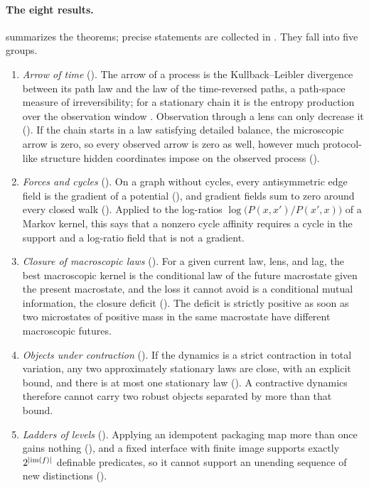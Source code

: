 \paragraph{The eight results.}
 summarizes the theorems; precise statements are collected in .
They fall into five groups.
\begin{enumerate}
  \item \emph{Arrow of time} ().
  The arrow of a process is the Kullback--Leibler divergence between its path law and the law of the time-reversed paths, a path-space measure of irreversibility; for a stationary chain it is the entropy production over the observation window \citep{MaesNetocny2003,Seifert2012}.
  Observation through a lens can only decrease it (\thmNGArrowDPI).
  If the chain starts in a law satisfying detailed balance, the microscopic arrow is zero, so every observed arrow is zero as well, however much protocol-like structure hidden coordinates impose on the observed process (\thmNGProtocolTrap).
  \item \emph{Forces and cycles} ().
  On a graph without cycles, every antisymmetric edge field is the gradient of a potential (\thmNGForceForest), and gradient fields sum to zero around every closed walk (\thmNGForceNull).
  Applied to the log-ratios $\log\bigl(P(x,x')/P(x',x)\bigr)$ of a Markov kernel, this says that a nonzero cycle affinity \citep{Schnakenberg1976} requires a cycle in the support and a log-ratio field that is not a gradient.
  \item \emph{Closure of macroscopic laws} ().
  For a given current law, lens, and lag, the best macroscopic kernel is the conditional law of the future macrostate given the present macrostate, and the loss it cannot avoid is a conditional mutual information, the closure deficit (\thmNGMacroClosureDeficit).
  The deficit is strictly positive as soon as two microstates of positive mass in the same macrostate have different macroscopic futures.
  \item \emph{Objects under contraction} ().
  If the dynamics is a strict contraction in total variation, any two approximately stationary laws are close, with an explicit bound, and there is at most one stationary law (\thmNGObjectContractive).
  A contractive dynamics therefore cannot carry two robust objects separated by more than that bound.
  \item \emph{Ladders of levels} ().
  Applying an idempotent packaging map more than once gains nothing (\thmNGLadderIdem), and a fixed interface with finite image supports exactly $2^{|\mathrm{im}(f)|}$ definable predicates, so it cannot support an unending sequence of new distinctions (\thmNGLadderBoundedInterface).
\end{enumerate}

